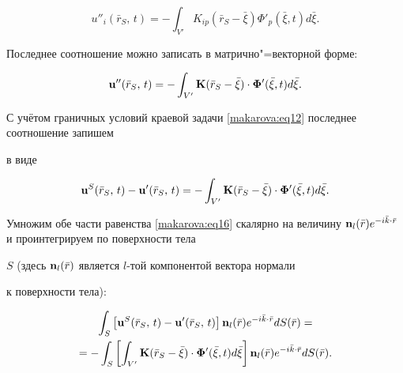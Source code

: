\begin{equation}

\label{makarova:eq14}

u''_i (\bar {r}_S ,\,t)=-\int_{V'} K_{ip} (\bar {r}_S -\bar {\xi})\Phi'_p (\bar {\xi } , t)d\bar {\xi}.

\end{equation}

Последнее соотношение можно записать в матрично"=векторной форме:

\begin{equation}

\label{makarova:eq15}

{\rm {\bf {u}''}}(\bar {r}_S,\,t)=-\int_{V'} {\rm {\bf K}}(\bar {r}_S -\bar {\xi})

\cdot {\rm {\bf {\Phi}'}}(\bar {\xi } , t)d\bar {\xi }.

\end{equation}

С учётом граничных условий краевой задачи \eqref{makarova:eq12} последнее соотношение запишем

в виде

\begin{equation}

\label{makarova:eq16}

{\rm {\bf u}}^S(\bar {r}_S,\,t)-{\rm {\bf{u}'}}(\bar {r}_S,\,t)=-\int_{V'} {\rm {\bf K}}(\bar

{r}_S -\bar {\xi})\cdot {\rm {\bf {\Phi}'}}(\bar {\xi} , t)d\bar {\xi }.

\end{equation}



Умножим обе части равенства \eqref{makarova:eq16} скалярно на величину ${\rm {\bf n}}_l (\bar

{r})e^{-i\bar {k}\cdot \bar {r}}$ и проинтегрируем по поверхности тела

$S$ (здесь ${\rm {\bf n}}_l (\bar {r})$ является $l$-той компонентой вектора нормали

к поверхности тела):

\begin{multline}

\label{makarova:eq17}

\int_S \left[ {\rm {\bf u}}^S(\bar {r}_S,\,t) - {\rm {\bf {u}'}}(\bar{r}_S,\,t)

\right]{\rm {\bf n}}_l (\bar {r})e^{-i\bar {k}\cdot \bar {r}}dS(\bar {r})= \\

=-\int_S \left[\int_{V'} {\rm {\bf K}}(\bar {r}_S -\bar {\xi })\cdot {\rm

{\bf {\Phi }'}}(\bar {\xi } , t) d\bar {\xi}\right]{\rm {\bf n}}_l

(\bar {r}) e^{-i\bar {k}\cdot \bar {r}}dS(\bar {r}).

\end{multline}

